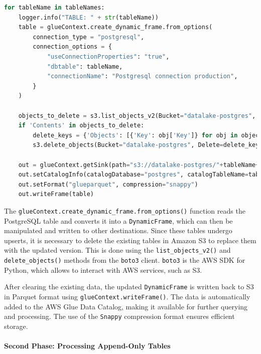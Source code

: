\begin{lstlisting}[language=Python, caption=First phase Postgres extraction]
for tableName in tableNames:
    logger.info("TABLE: " + str(tableName))
    table = glueContext.create_dynamic_frame.from_options(
        connection_type = "postgresql",
        connection_options = {
            "useConnectionProperties": "true",
            "dbtable": tableName,
            "connectionName": "Postgresql connection production",
        }
    )
    
    objects_to_delete = s3.list_objects_v2(Bucket="datalake-postgres", Prefix=tableName+"/")
    if 'Contents' in objects_to_delete:
        delete_keys = {'Objects': [{'Key': obj['Key']} for obj in objects_to_delete['Contents']]}
        s3.delete_objects(Bucket="datalake-postgres", Delete=delete_keys)

    out = glueContext.getSink(path="s3://datalake-postgres/"+tableName+"/", connection_type="s3", updateBehavior="UPDATE_IN_DATABASE", partitionKeys=[], enableUpdateCatalog=True, transformation_ctx="write_"+tableName)
    out.setCatalogInfo(catalogDatabase="postgres", catalogTableName=tableName)
    out.setFormat("glueparquet", compression="snappy")
    out.writeFrame(table)
\end{lstlisting}

The \texttt{glueContext.create\_dynamic\_frame.from\_options()} function reads the PostgreSQL table and converts it into a \texttt{DynamicFrame}, which can then be manipulated and written to other destinations. Since these tables undergo upserts, it is necessary to delete the existing tables in Amazon S3 to replace them with the updated version. This is done using the \texttt{list\_objects\_v2()} and \texttt{delete\_objects()} methods from the \texttt{boto3} client. \texttt{boto3} is the AWS SDK for Python, which allows to interact with AWS services, such as S3.

After clearing the existing data, the updated \texttt{DynamicFrame} is written back to S3 in Parquet format using \texttt{glueContext.writeFrame()}. The data is automatically added to the AWS Glue Data Catalog, making it available for further querying and processing. The use of the \texttt{Snappy} compression format ensures efficient storage.

\paragraph{Second Phase: Processing Append-Only Tables}

